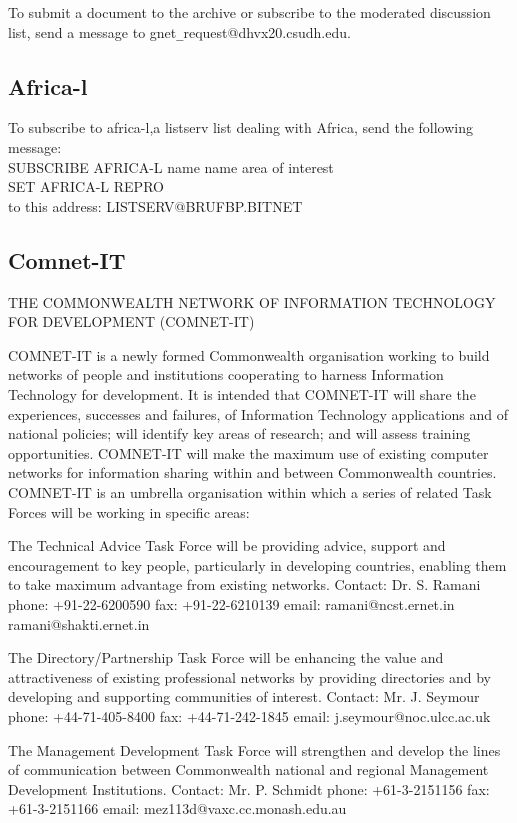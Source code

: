 To submit a document to the archive or subscribe to the moderated 
discussion list, send a message to gnet\verb+_+request@dhvx20.csudh.edu.  

\subsection{Africa-l}

To subscribe to africa-l,a  listserv list dealing with Africa, send
the following message:\\
	SUBSCRIBE AFRICA-L name name area of interest\\
	SET AFRICA-L REPRO\\
to this address: LISTSERV@BRUFBP.BITNET

\subsection{Comnet-IT}

THE COMMONWEALTH NETWORK OF INFORMATION
TECHNOLOGY FOR DEVELOPMENT (COMNET-IT)

COMNET-IT is a newly formed Commonwealth organisation working  to
build networks of people and institutions cooperating to harness Information
Technology for development.
It is intended that COMNET-IT will share the experiences, successes and
failures, of Information Technology applications and of national policies; 
will identify key areas of research; and will assess training opportunities.
COMNET-IT will make the maximum use of existing computer networks for
information sharing within and between Commonwealth countries.
COMNET-IT is an umbrella organisation within which a series of related
Task Forces will be working in specific areas:

	The Technical Advice Task Force will be providing advice, support and
encouragement to key people, particularly in developing countries, enabling them to take maximum advantage from existing networks.
	Contact:			Dr. S. Ramani
					phone: +91-22-6200590
					fax:   +91-22-6210139
					email: ramani@ncst.ernet.in
					       ramani@shakti.ernet.in

	The Directory/Partnership Task Force will be enhancing the value and
attractiveness of existing professional networks by providing directories and by developing and supporting communities of interest.
	Contact:			Mr. J. Seymour
					phone: +44-71-405-8400
					fax:   +44-71-242-1845
					email: j.seymour@noc.ulcc.ac.uk

	The Management Development Task Force will strengthen and
develop the lines of communication between Commonwealth national and regional Management Development Institutions.
	Contact:			Mr. P. Schmidt
					phone: +61-3-2151156
					fax:   +61-3-2151166
					email:
mez113d@vaxc.cc.monash.edu.au

